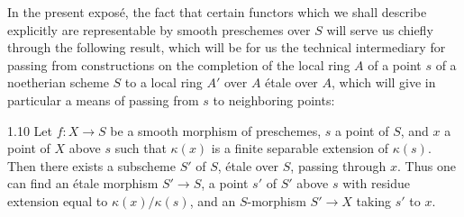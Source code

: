 In the present exposé, the fact that certain functors which we shall describe explicitly are representable by smooth preschemes over $S$ will serve us chiefly through the following result, which will be for us the technical intermediary for passing from constructions on the completion of the local ring $A$ of a point $s$ of a noetherian scheme $S$ to a local ring $A'$ over $A$ étale over $A$, which will give in particular a means of passing from $s$ to neighboring points:
\begin{proposition}{1.10}\label{XI.1.10}
Let $f:X\to S$ be a smooth morphism of preschemes, $s$ a point of $S$, and $x$ a point of $X$ above $s$ such that $\kappa(x)$ is a finite separable extension of $\kappa(s)$. Then there exists a subscheme $S'$ of $S$, étale over $S$, passing through $x$. Thus one can find an étale morphism $S'\to S$, a point $s'$ of $S'$ above $s$ with residue extension equal to $\kappa(x)/\kappa(s)$, and an $S$-morphism $S'\to X$ taking $s'$ to $x$.
\end{proposition}
